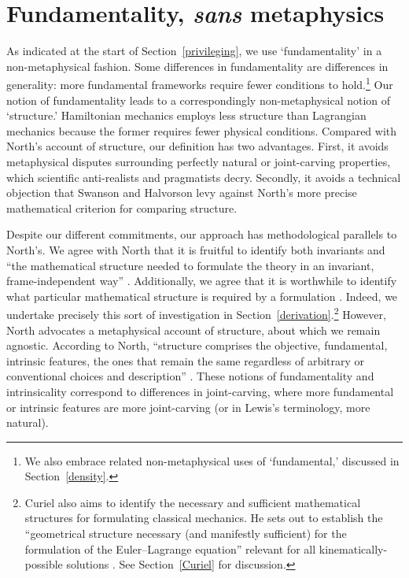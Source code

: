 \documentclass[12pt, english, twoside]{article} %
\begin{document}
\section{Fundamentality, \textit{sans} metaphysics}
\label{fundamentality}

As indicated at the start of Section~\ref{privileging}, we use `fundamentality' in a non-metaphysical fashion. Some differences in fundamentality are differences in generality: more fundamental frameworks require fewer conditions to hold.\footnote{We also embrace related non-metaphysical uses of `fundamental,' discussed in Section~\ref{density}.} Our notion of fundamentality leads to a correspondingly non-metaphysical notion of `structure.' Hamiltonian mechanics employs less structure than Lagrangian mechanics because the former requires fewer physical conditions. Compared with North's \parencites*[]{North} account of structure, our definition has two advantages. First, it avoids metaphysical disputes surrounding perfectly natural or joint-carving properties, which scientific anti-realists and pragmatists decry. Secondly, it avoids a technical objection that Swanson and Halvorson \parencites*[]{Swanson} levy against North's more precise mathematical criterion for comparing structure. 

Despite our different commitments, our approach has methodological parallels to North's. We agree with North that it is fruitful to identify both invariants and ``the mathematical structure needed to formulate the theory in an invariant, frame-independent way'' \parencites*[65]{North}. Additionally, we agree that it is worthwhile to identify what particular mathematical structure is required by a formulation \parencites[78]{North}. Indeed, we undertake precisely this sort of investigation in Section~\ref{derivation}.\footnote{Curiel also aims to identify the necessary and sufficient mathematical structures for formulating classical mechanics. He sets out to establish the ``geometrical structure necessary (and manifestly sufficient) for the formulation of the Euler--Lagrange equation'' relevant for all kinematically-possible solutions \parencites*[292]{Curiel}. See Section~\ref{Curiel} for discussion.} However, North advocates a metaphysical account of structure, about which we remain agnostic. According to North, ``structure comprises the objective, fundamental, intrinsic features, the ones that remain the same regardless of arbitrary or conventional choices and description'' \parencites*[66]{North}. These notions of fundamentality and intrinsicality correspond to differences in joint-carving, where more fundamental or intrinsic features are more joint-carving (or in Lewis's \parencites*[]{Lewis1983} terminology, more natural). 
\end{document}
